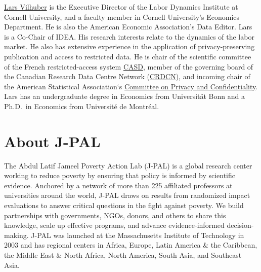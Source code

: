 \documentclass[11pt]{book}
\begin{document}
\href{https://www.vilhuber.com/lars/}{Lars Vilhuber} is the Executive
Director of the Labor Dynamics Institute at Cornell University, and a
faculty member in Cornell University's Economics Department. He is also
the American Economic Association's Data Editor. Lars is a Co-Chair of
IDEA. His research interests relate to the dynamics of the labor market.
He also has extensive experience in the application of
privacy-preserving publication and access to restricted data. He is
chair of the scientific committee of the French restricted-access system
\href{https://casd.eu}{CASD}, member of the governing board of the
Canadian Research Data Centre Network (\href{https://crdcn.org}{CRDCN}),
and incoming chair of the American Statistical Association`s
\href{https://community.amstat.org/cpc/home}{Committee on Privacy and
Confidentiality}. Lars has an undergraduate degree in Economics from
Universität Bonn and a Ph.D.~in Economics from Université de Montréal.

\section*{About J-PAL}\label{about-j-pal} %
{}

The Abdul Latif Jameel Poverty Action Lab (J-PAL) is a global research
center working to reduce poverty by ensuring that policy is informed by
scientific evidence. Anchored by a network of more than 225 affiliated
professors at universities around the world, J-PAL draws on results from
randomized impact evaluations to answer critical questions in the fight
against poverty. We build partnerships with governments, NGOs, donors,
and others to share this knowledge, scale up effective programs, and
advance evidence-informed decision-making. J-PAL was launched at the
Massachusetts Institute of Technology in 2003 and has regional centers
in Africa, Europe, Latin America \& the Caribbean, the Middle East \&
North Africa, North America, South Asia, and Southeast Asia.






\mainmatter
\setcounter{page}{1}

\end{document}
